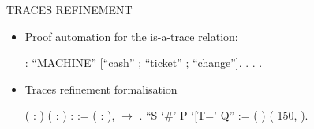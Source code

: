 \documentclass[t]{beamer}
\begin{document}
\begin{frame}{TRACES REFINEMENT}
	\begin{itemize}
		\item Proof automation for the is-a-trace relation: \\
		\begin{coqdoccode}
			\small
			\coqdocnoindent
			  :\coqdoceol
			\coqdocindent{1.00em}
			  ``MACHINE'' [``cash'' ; ``ticket'' ; ``change''].\coqdoceol
			\coqdocnoindent
			. . .\coqdoceol
		\end{coqdoccode}

		\item Traces refinement formalisation\\
		\begin{coqdoccode}
			\small
			\coqdocnoindent
			  ( : ) (  : ) :  :=\coqdoceol
			\coqdocindent{1.00em}
			\coqdockw{\ensuremath{\forall}} ( : ),     \ensuremath{\rightarrow}    .\coqdoceol
			\coqdocemptyline
			\coqdocnoindent
			 ``S `\#' P `[T=' Q'' := (   )\coqdoceol
			\coqdocindent{1.00em}
			(  150,  ).\coqdoceol
		\end{coqdoccode}
	\end{itemize}
\end{frame}
\end{document}
